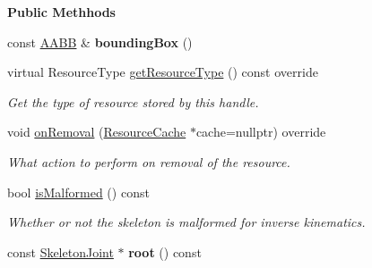 \begin{Indent}\textbf{ Public Methhods}\par
\begin{DoxyCompactItemize}
\item 
\mbox{\label{classrev_1_1_skeleton_a0df67772aee38fa2dbaead05951b65dc}} 
const \mbox{\hyperlink{classrev_1_1_a_a_b_b}{A\+A\+BB}} \& {\bfseries bounding\+Box} ()
\item 
\mbox{\label{classrev_1_1_skeleton_a0fd9fc350c2caa1693ebd14850a1dc1f}} 
virtual Resource\+Type \mbox{\hyperlink{classrev_1_1_skeleton_a0fd9fc350c2caa1693ebd14850a1dc1f}{get\+Resource\+Type}} () const override
\begin{DoxyCompactList}\small\item\em Get the type of resource stored by this handle. \end{DoxyCompactList}\item 
\mbox{\label{classrev_1_1_skeleton_a572082d61689a0effafe7691fa723a0e}} 
void \mbox{\hyperlink{classrev_1_1_skeleton_a572082d61689a0effafe7691fa723a0e}{on\+Removal}} (\mbox{\hyperlink{classrev_1_1_resource_cache}{Resource\+Cache}} $\ast$cache=nullptr) override
\begin{DoxyCompactList}\small\item\em What action to perform on removal of the resource. \end{DoxyCompactList}\item 
\mbox{\label{classrev_1_1_skeleton_a00b6b49047db0293ad3a26fbd74be904}} 
bool \mbox{\hyperlink{classrev_1_1_skeleton_a00b6b49047db0293ad3a26fbd74be904}{is\+Malformed}} () const
\begin{DoxyCompactList}\small\item\em Whether or not the skeleton is malformed for inverse kinematics. \end{DoxyCompactList}\item 
\mbox{\label{classrev_1_1_skeleton_a19d28390c0486a7fad737d84360260d5}} 
const \mbox{\hyperlink{classrev_1_1_skeleton_joint}{Skeleton\+Joint}} $\ast$ {\bfseries root} () const
\item 
\mbox{\label{classrev_1_1_skeleton_ab03b4c20a06b50056c77fa7685a78bc1}} 

\end{DoxyCompactItemize}
\end{Indent}

